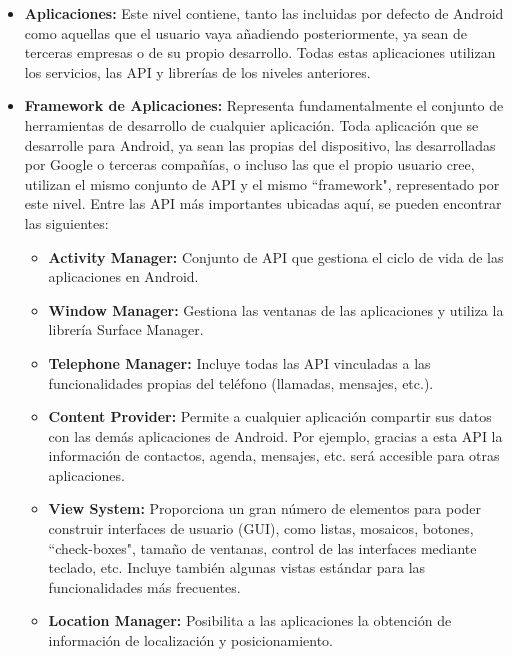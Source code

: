 \documentclass[letterpaper,12pt,openany,oneside]{book}
\begin{document}
\begin{itemize}




\item   \textbf{Aplicaciones:} Este nivel contiene, tanto las incluidas por defecto de Android como aquellas que el usuario vaya añadiendo posteriormente, ya sean de terceras empresas o de su propio desarrollo. Todas estas aplicaciones utilizan los servicios, las API y librerías de los niveles anteriores.

\item   \textbf{Framework de Aplicaciones:} Representa fundamentalmente el conjunto de herramientas de desarrollo de cualquier aplicación. Toda aplicación que se desarrolle para Android, ya sean las propias del dispositivo, las desarrolladas por Google o terceras compañías, o incluso las que el propio usuario cree, utilizan el mismo conjunto de API y el mismo ``framework", representado por este nivel.
        Entre las API más importantes ubicadas aquí, se pueden encontrar las siguientes:

\begin{itemize}

\item         \textbf{Activity Manager:} Conjunto de API que gestiona el ciclo de vida de las aplicaciones en Android.

\item      \textbf{ Window Manager:} Gestiona las ventanas de las aplicaciones y utiliza la librería Surface Manager.

\item   \textbf {Telephone Manager:} Incluye todas las API vinculadas a las funcionalidades propias del teléfono (llamadas, mensajes, etc.).

\item  \textbf {Content Provider:} Permite a cualquier aplicación compartir sus datos con las demás aplicaciones de Android. Por ejemplo, gracias a esta API la información de contactos, agenda, mensajes, etc. será accesible para otras aplicaciones.

\item    \textbf{ View System:} Proporciona un gran número de elementos para poder construir interfaces de usuario (GUI), como listas, mosaicos, botones, ``check-boxes", tamaño de ventanas, control de las interfaces mediante teclado, etc. Incluye también algunas vistas estándar para las funcionalidades más frecuentes.

\item      \textbf{ Location Manager:} Posibilita a las aplicaciones la obtención de información de localización y  posicionamiento.


\end{itemize}
\end{itemize}
\end{document}
